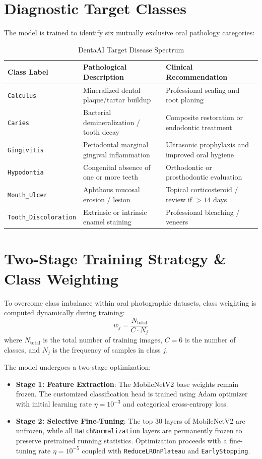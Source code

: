 \documentclass[12pt,a4paper]{report}
\begin{document}
\section{Diagnostic Target Classes}
The model is trained to identify six mutually exclusive oral pathology categories:
\begin{table}[H]
\centering
\small
\begin{tabular}{@{}lll@{}}
\toprule
\textbf{Class Label} & \textbf{Pathological Description} & \textbf{Clinical Recommendation} \\ \midrule
\texttt{Calculus} & Mineralized dental plaque/tartar buildup & Professional scaling and root planing \\
\texttt{Caries} & Bacterial demineralization / tooth decay & Composite restoration or endodontic treatment \\
\texttt{Gingivitis} & Periodontal marginal gingival inflammation & Ultrasonic prophylaxis and improved oral hygiene \\
\texttt{Hypodontia} & Congenital absence of one or more teeth & Orthodontic or prosthodontic evaluation \\
\texttt{Mouth\_Ulcer} & Aphthous mucosal erosion / lesion & Topical corticosteroid / review if $>14$ days \\
\texttt{Tooth\_Discoloration} & Extrinsic or intrinsic enamel staining & Professional bleaching / veneers \\ \bottomrule
\end{tabular}
\caption{DentaAI Target Disease Spectrum}
\end{table}

\section{Two-Stage Training Strategy \& Class Weighting}
To overcome class imbalance within oral photographic datasets, class weighting is computed dynamically during training:
\begin{equation}
    w_j = \frac{N_{\text{total}}}{C \cdot N_j}
\end{equation}
where $N_{\text{total}}$ is the total number of training images, $C=6$ is the number of classes, and $N_j$ is the frequency of samples in class $j$.

The model undergoes a two-stage optimization:
\begin{itemize}
    \item \textbf{Stage 1: Feature Extraction}: The MobileNetV2 base weights remain frozen. The customized classification head is trained using Adam optimizer with initial learning rate $\eta = 10^{-3}$ and categorical cross-entropy loss.
    \item \textbf{Stage 2: Selective Fine-Tuning}: The top 30 layers of MobileNetV2 are unfrozen, while all \texttt{BatchNormalization} layers are permanently frozen to preserve pretrained running statistics. Optimization proceeds with a fine-tuning rate $\eta = 10^{-5}$ coupled with \texttt{ReduceLROnPlateau} and \texttt{EarlyStopping}.
\end{itemize}
\end{document}
